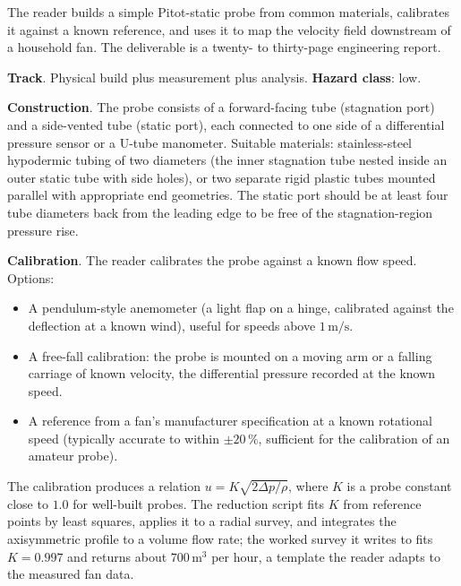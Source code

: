 \begin{project}
The reader builds a simple Pitot-static probe from common
materials, calibrates it against a known reference, and uses it to
map the velocity field downstream of a household fan. The
deliverable is a twenty- to thirty-page engineering report.

\textbf{Track}. Physical build plus measurement plus analysis.
\textbf{Hazard class}: low.

\textbf{Construction}. The probe consists of a forward-facing tube
(stagnation port) and a side-vented tube (static port), each
connected to one side of a differential pressure sensor or a
U-tube manometer. Suitable materials: stainless-steel hypodermic
tubing of two diameters (the inner stagnation tube nested inside an
outer static tube with side holes), or two separate rigid plastic
tubes mounted parallel with appropriate end geometries. The static
port should be at least four tube diameters back from the leading
edge to be free of the stagnation-region pressure rise.

\textbf{Calibration}. The reader calibrates the probe against a
known flow speed. Options:

\begin{itemize}[leftmargin=*]
  \item A pendulum-style anemometer (a light flap on a hinge,
    calibrated against the deflection at a known wind), useful for
    speeds above $1\,\si{\meter\per\second}$.
  \item A free-fall calibration: the probe is mounted on a moving
    arm or a falling carriage of known velocity, the differential
    pressure recorded at the known speed.
  \item A reference from a fan's manufacturer specification at a
    known rotational speed (typically accurate to within
    $\pm 20\,\%$, sufficient for the calibration of an amateur
    probe).
\end{itemize}

The calibration produces a relation $u = K\sqrt{2 \Delta p/\rho}$,
where $K$ is a probe constant close to $1.0$ for well-built
probes. The reduction script  fits
$K$ from reference points by least squares, applies it to a radial
survey, and integrates the axisymmetric profile to a volume flow
rate; the worked survey it writes to 
fits $K = 0.997$ and returns about $700\,\si{\meter\cubed}$ per hour,
a template the reader adapts to the measured fan data.


\end{project}
